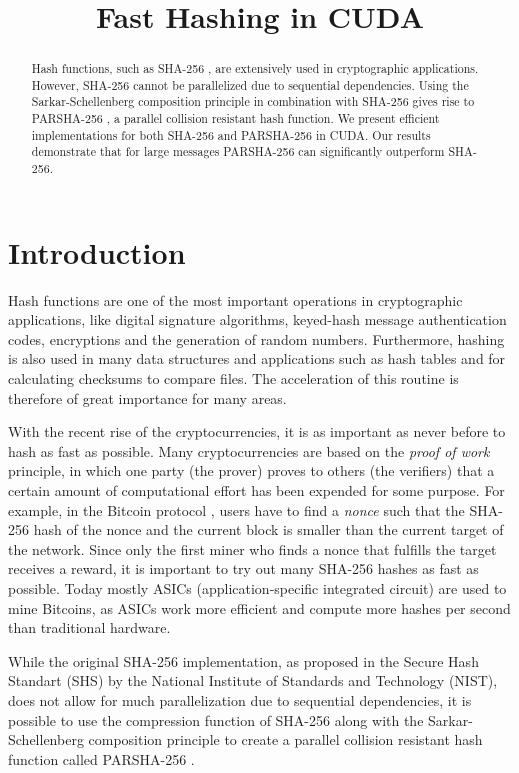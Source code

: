 \documentclass[letterpaper]{article}
\title{Fast Hashing in CUDA}
\begin{document}
%
\maketitle
%


\begin{abstract}
Hash functions, such as SHA-256 \cite{sha}, are extensively used in cryptographic applications.
However, SHA-256 cannot be parallelized due to sequential dependencies.
Using the Sarkar-Schellenberg composition principle \cite{sarkar} in combination with SHA-256 gives rise to PARSHA-256 \cite{parsha256}, a parallel collision resistant hash function. We present efficient implementations for both SHA-256 and  PARSHA-256 in CUDA. Our results demonstrate that for large messages PARSHA-256 can significantly outperform SHA-256.
\end{abstract}

\section{Introduction}\label{sec:intro}
Hash functions are one of the most important operations in cryptographic applications, like digital signature algorithms, keyed-hash message authentication codes, encryptions and the generation of random numbers. Furthermore, hashing is also used in many data structures and applications such as hash tables and for calculating checksums to compare files.  The acceleration of this routine is therefore of great importance for many areas.

With the recent rise of the cryptocurrencies, it is as important as never before to hash as fast as possible. Many cryptocurrencies are based on the \emph{proof of work} \cite{pow} principle, in which one party (the prover) proves to others (the verifiers) that a certain amount of computational effort has been expended for some purpose. For example, in the Bitcoin protocol \cite{nakamoto2012bitcoin}, users have to find a \emph{nonce} such that the SHA-256 hash of the nonce and the current block is smaller than the current target of the network. Since only the first miner who finds a nonce that fulfills the target receives a reward, it is important to try out many SHA-256 hashes as fast as possible. Today mostly ASICs (application-specific integrated circuit) are used to mine Bitcoins, as ASICs work more efficient and compute more hashes per second than traditional hardware.

While the original SHA-256 implementation, as proposed in the Secure Hash Standart (SHS) \cite{sha} by the National Institute of Standards and Technology (NIST), does not allow for much parallelization due to sequential dependencies, it is possible to use the compression function of SHA-256 along with the Sarkar-Schellenberg composition principle \cite{sarkar} to create a parallel collision resistant hash function called PARSHA-256 \cite{parsha256}. 
\end{document}
